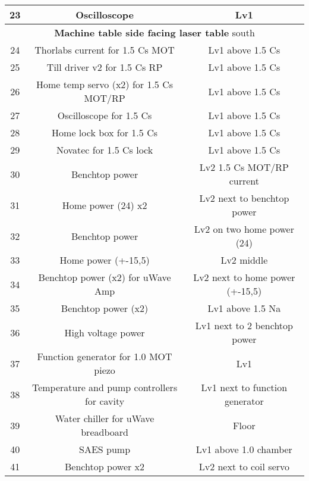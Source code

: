 \documentclass[10pt,fleqn,twocolumn]{article}
\begin{document}
\begin{longtable}{|c|c|c|}
  23&Oscilloscope&Lv1\\\hline
  \multicolumn{3}{|c|}{\textbf{Machine table side facing laser table} south}\\\hline
  24&Thorlabs current for 1.5 Cs MOT&Lv1 above 1.5 Cs\\\hline
  25&Till driver v2 for 1.5 Cs RP&Lv1 above 1.5 Cs\\\hline
  26&Home temp servo (x2) for 1.5 Cs MOT/RP&Lv1 above 1.5 Cs\\\hline
  27&Oscilloscope for 1.5 Cs&Lv1 above 1.5 Cs\\\hline
  28&Home lock box for 1.5 Cs&Lv1 above 1.5 Cs\\\hline
  29&Novatec for 1.5 Cs lock&Lv1 above 1.5 Cs\\\hline
  30&Benchtop power&Lv2 1.5 Cs MOT/RP current\\\hline
  31&Home power (24) x2&Lv2 next to benchtop power\\\hline
  32&Benchtop power&Lv2 on two home power (24)\\\hline
  33&Home power (+-15,5)&Lv2 middle\\\hline
  34&Benchtop power (x2) for uWave Amp&Lv2 next to home power (+-15,5)\\\hline
  35&Benchtop power (x2)&Lv1 above 1.5 Na\\\hline
  36&High voltage power&Lv1 next to 2 benchtop power\\\hline
  37&Function generator for 1.0 MOT piezo&Lv1\\\hline
  38&Temperature and pump controllers for cavity&Lv1 next to function generator\\\hline
  39&Water chiller for uWave breadboard&Floor\\\hline
  40&SAES pump&Lv1 above 1.0 chamber\\\hline
  41&Benchtop power x2&Lv2 next to coil servo\\\hline
\end{longtable}
\twocolumn
\end{document}
